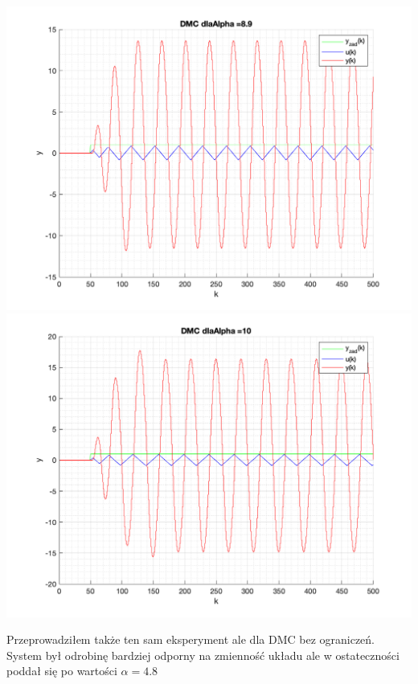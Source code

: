 \documentclass[a4paper, 11pt]{article}
\begin{document}
\begin{enumerate}
 \includegraphics[width=\linewidth]{./ModelsDodatkowe_Alpha/P4_DMC_Alpha_8_9_png.png} 
 \includegraphics[width=\linewidth]{./ModelsDodatkowe_Alpha/P4_DMC_Alpha_10_png.png} 
 \newpage
 
 Przeprowadziłem także ten sam eksperyment ale dla DMC bez ograniczeń. System był odrobinę bardziej odporny na zmienność układu ale w ostateczności poddał się po wartości \( \alpha = 4.8\)
  

\end{enumerate}
\end{document}
